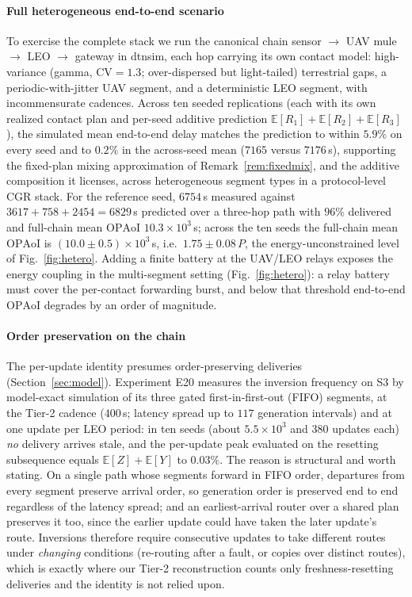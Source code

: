 \documentclass[twocolumn,3p,times,procedia]{elsarticle}
\theoremstyle{plain}
\theoremstyle{remark}
\newcommand{\OPAoI}{\mathrm{OPAoI}}
\newcommand{\E}{\mathbb{E}}
\begin{document}
\paragraph*{Full heterogeneous end-to-end scenario}
To exercise the complete stack we run the canonical chain sensor $\to$ UAV
mule $\to$ LEO $\to$ gateway in dtnsim, each hop carrying its own contact
model: high-variance (gamma, $\mathrm{CV}{=}1.3$; over-dispersed but
light-tailed) terrestrial gaps, a periodic-with-jitter UAV segment, and a
deterministic LEO segment, with incommensurate cadences. Across ten
seeded replications (each with its own realized contact plan and
per-seed additive prediction $\E[R_1]{+}\E[R_2]{+}\E[R_3]$), the
simulated mean end-to-end delay matches the prediction to within
$5.9\%$ on every seed and to $0.2\%$ in the across-seed mean
($7165$ versus $7176$\,s), supporting the fixed-plan mixing
approximation of Remark~\ref{rem:fixedmix}, and the additive
composition it licenses, across heterogeneous segment types in a
protocol-level CGR stack. For the reference seed, $6754$\,s measured
against $3617{+}758{+}2454{=}6829$\,s predicted over a three-hop path
with $96\%$ delivered and full-chain mean $\OPAoI$
$10.3\times10^{3}$\,s; across the ten seeds the full-chain mean
$\OPAoI$ is $(10.0\pm0.5)\times10^{3}$\,s, i.e.\ $1.75\pm0.08\,P$, the
energy-unconstrained level of Fig.~\ref{fig:hetero}. Adding a finite
battery at the UAV/LEO relays exposes the energy coupling in the
multi-segment setting (Fig.~\ref{fig:hetero}): a relay battery must
cover the per-contact forwarding burst, and below that threshold
end-to-end $\OPAoI$ degrades by an order of magnitude.



\paragraph*{Order preservation on the chain}
The per-update identity presumes order-preserving deliveries
(Section~\ref{sec:model}). Experiment E20 measures the inversion
frequency on S3 by model-exact simulation of its three gated
first-in-first-out (FIFO) segments, at the Tier-2 cadence ($400$\,s; latency spread up to $117$
generation intervals) and at one update per LEO period: in ten seeds
(about $5.5\times10^{3}$ and $380$ updates each) \emph{no} delivery arrives
stale, and the per-update peak evaluated on the resetting subsequence
equals $\E[Z]+\E[Y]$ to $0.03\%$. The reason is structural and worth
stating. On a single path whose segments forward in FIFO order,
departures from every segment preserve arrival order, so generation
order is preserved end to end regardless of the latency spread; and an
earliest-arrival router over a shared plan preserves it too, since the
earlier update could have taken the later update's route. Inversions
therefore require consecutive updates to take different routes under
\emph{changing} conditions (re-routing after a fault, or copies over
distinct routes), which is exactly where our Tier-2 reconstruction
counts only freshness-resetting deliveries and the identity is not
relied upon.
\end{document}
